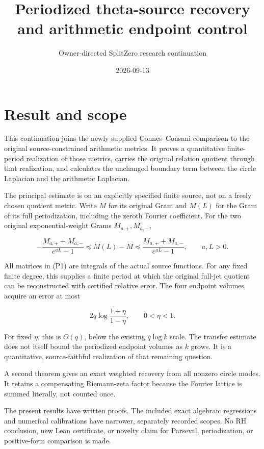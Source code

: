 \documentclass[
]{article}
\title{Periodized theta-source recovery and arithmetic endpoint control}
\author{Owner-directed SplitZero research continuation}
\date{2026-09-13}
\begin{document}
\maketitle

\section{Result and scope}\label{result-and-scope}

This continuation joins the newly supplied Connes--Consani comparison to
the original source-constrained arithmetic metrics. It proves a
quantitative finite-period realization of those metrics, carries the
original relation quotient through that realization, and calculates the
unchanged boundary term between the circle Laplacian and the arithmetic
Laplacian.

The principal estimate is on an explicitly specified finite source, not
on a freely chosen quotient metric. Write \(M\) for its original Gram
and \(M(L)\) for the Gram of its full periodization, including the
zeroth Fourier coefficient. For the two original exponential-weight
Grams \(M_{a,+},M_{a,-}\),

\[
-\frac{M_{a,+}+M_{a,-}}{e^{aL}-1}
\preceq M(L)-M
\preceq\frac{M_{a,+}+M_{a,-}}{e^{aL}-1},\qquad a,L>0. \tag{P1}
\]

All matrices in (P1) are integrals of the actual source functions. For
any fixed finite degree, this supplies a finite period at which the
original full-jet quotient can be reconstructed with certified relative
error. The four endpoint volumes acquire an error at most

\[
2q\log\frac{1+\eta}{1-\eta},\qquad 0<\eta<1. \tag{P2}
\]

For fixed \(\eta\), this is \(O(q)\), below the existing \(q\log k\)
scale. The transfer estimate does not itself bound the periodized
endpoint volumes as \(k\) grows. It is a quantitative, source-faithful
realization of that remaining question.

A second theorem gives an exact weighted recovery from all nonzero
circle modes. It retains a compensating Riemann-zeta factor because the
Fourier lattice is summed literally, not counted once.

The present results have written proofs. The included exact algebraic
regressions and numerical calibrations have narrower, separately
recorded scopes. No RH conclusion, new Lean certificate, or novelty
claim for Parseval, periodization, or positive-form comparison is made.
\end{document}
